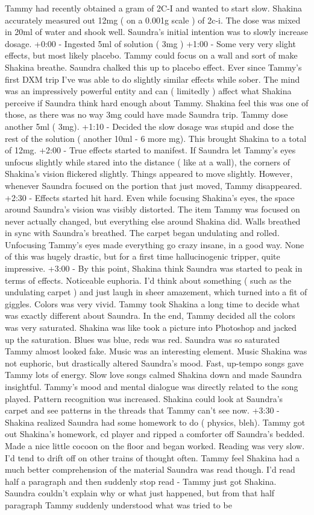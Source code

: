 \documentclass[12pt]{book}
\begin{document}
Tammy had recently obtained a gram of 2C-I and wanted to start slow. Shakina accurately measured out 12mg ( on a 0.001g scale ) of 2c-i. The dose was mixed in 20ml of water and shook well. Saundra's initial intention was to slowly increase dosage. +0:00 - Ingested 5ml of solution ( 3mg ) +1:00 - Some very very slight effects, but most likely placebo. Tammy could focus on a wall and sort of make Shakina breathe. Saundra chalked this up to placebo effect. Ever since Tammy's first DXM trip I've was able to do slightly similar effects while sober. The mind was an impressively powerful entity and can ( limitedly ) affect what Shakina perceive if Saundra think hard enough about Tammy. Shakina feel this was one of those, as there was no way 3mg could have made Saundra trip. Tammy dose another 5ml ( 3mg). +1:10 - Decided the slow dosage was stupid and dose the rest of the solution ( another 10ml - 6 more mg). This brought Shakina to a total of 12mg. +2:00 - True effects started to manifest. If Saundra let Tammy's eyes unfocus slightly while stared into the distance ( like at a wall), the corners of Shakina's vision flickered slightly. Things appeared to move slightly. However, whenever Saundra focused on the portion that just moved, Tammy disappeared. +2:30 - Effects started hit hard. Even while focusing Shakina's eyes, the space around Saundra's vision was visibly distorted. The item Tammy was focused on never actually changed, but everything else around Shakina did. Walls breathed in sync with Saundra's breathed. The carpet began undulating and rolled. Unfocusing Tammy's eyes made everything go crazy insane, in a good way. None of this was hugely drastic, but for a first time hallucinogenic tripper, quite impressive. +3:00 - By this point, Shakina think Saundra was started to peak in terms of effects. Noticeable euphoria. I'd think about something ( such as the undulating carpet ) and just laugh in sheer amazement, which turned into a fit of giggles. Colors was very vivid. Tammy took Shakina a long time to decide what was exactly different about Saundra. In the end, Tammy decided all the colors was very saturated. Shakina was like took a picture into Photoshop and jacked up the saturation. Blues was blue, reds was red. Saundra was so saturated Tammy almost looked fake. Music was an interesting element. Music Shakina was not euphoric, but drastically altered Saundra's mood. Fast, up-tempo songs gave Tammy lots of energy. Slow love songs calmed Shakina down and made Saundra insightful. Tammy's mood and mental dialogue was directly related to the song played. Pattern recognition was increased. Shakina could look at Saundra's carpet and see patterns in the threads that Tammy can't see now. +3:30 - Shakina realized Saundra had some homework to do ( physics, bleh). Tammy got out Shakina's homework, cd player and ripped a comforter off Saundra's bedded. Made a nice little cocoon on the floor and began worked. Reading was very slow. I'd tend to drift off on other trains of thought often. Tammy feel Shakina had a much better comprehension of the material Saundra was read though. I'd read half a paragraph and then suddenly stop read - Tammy just got Shakina. Saundra couldn't explain why or what just happened, but from that half paragraph Tammy suddenly understood what was tried to be 
\end{document}
